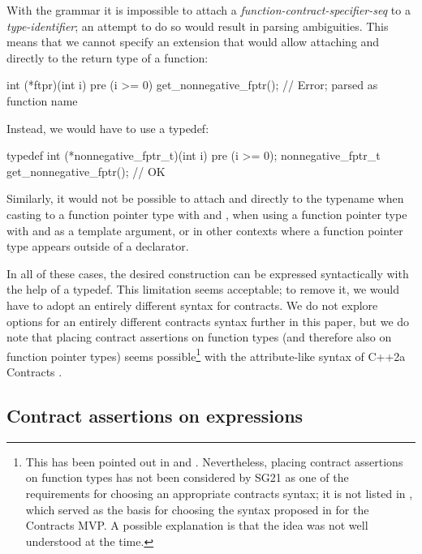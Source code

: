 With the \cite{P2900R8} grammar it is impossible to attach a \emph{function-contract-specifier-seq} to a \emph{type-identifier}; an attempt to do so would result in parsing ambiguities. This means that we cannot specify an extension that would allow attaching  and  directly to the return type of a function:
\begin{codeblock}
int (*ftpr)(int i) pre (i >= 0) get_nonnegative_fptr();  // Error;  parsed as function name
\end{codeblock}
Instead, we would have to use a typedef:
\begin{codeblock}
typedef int (*nonnegative_fptr_t)(int i) pre (i >= 0); 
nonnegative_fptr_t get_nonnegative_fptr();  // OK
\end{codeblock}
Similarly, it would not be possible to attach  and  directly to the typename when casting to a function pointer type with   and , when using a function pointer type with  and  as a template argument, or in other contexts where a function pointer type appears outside of a declarator.

In all of these cases, the desired construction can be expressed syntactically with the help of a typedef. This limitation seems acceptable; to remove it, we would have to adopt an entirely different syntax for contracts. We do not explore options for an entirely different contracts syntax further in this paper, but we do note that placing contract assertions on function types (and therefore also on function pointer types) seems possible\footnote{This has been pointed out in \cite{P2935R4} and \cite{P3028R0}. Nevertheless,  placing contract assertions on function types has not been considered by SG21 as one of the requirements for choosing an appropriate contracts syntax; it is not listed in \cite{P2885R3}, which served as the basis for choosing the syntax proposed in \cite{P2961R2} for the Contracts MVP. A possible explanation is that the idea was not well understood at the time.} with the attribute-like syntax of C++2a Contracts \cite{P0542R5}.


\subsection{Contract assertions on expressions}
\label{syntax_expr}


